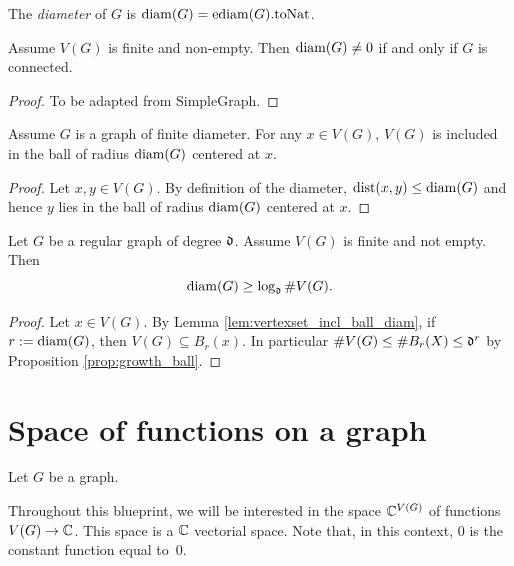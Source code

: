 \begin{definition}
  \label{def:diameter}
  The \emph{diameter} of $G$ is $\mathrm{diam}(G) = \mathrm{ediam}(G).\mathrm{toNat}$.
\end{definition}

\begin{lemma}
  \label{lem:connected_iff_diam_ne_zero}
  Assume $V(G)$ is finite and non-empty. Then $\mathrm{diam}(G) \neq 0$ if and only if
  $G$ is connected.
\end{lemma}
\begin{proof}
  To be adapted from SimpleGraph.
\end{proof}

\begin{lemma}
  \label{lem:vertexset_incl_ball_diam}
  Assume $G$ is a graph of finite diameter.
  For any $x \in V(G)$, $V(G)$ is included in the ball of radius $\mathrm{diam}(G)$
  centered at $x$.
\end{lemma}

\begin{proof}
  Let $x, y \in V(G)$. By definition of the diameter, $\mathrm{dist}(x,y) \leq \mathrm{diam}(G)$
  and hence $y$ lies in the ball of radius $\mathrm{diam}(G)$ centered at $x$.
\end{proof}

\begin{proposition}
  \label{prop:bound_diameter_regular}
  Let $G$ be a regular graph of degree $\mathfrak{d}$. Assume $V(G)$ is finite and not empty.
  Then
  \begin{equation}
    \mathrm{diam}(G) \geq \log_{\mathfrak{d}} \# V(G).
  \end{equation}
\end{proposition}

\begin{proof}
  Let $x \in V(G)$.
  By Lemma \ref{lem:vertexset_incl_ball_diam}, if $r := \mathrm{diam}(G)$,
  then $V(G) \subseteq B_r(x)$. In particular $\# V(G) \leq \# B_r(X) \leq \mathfrak{d}^r$
  by Proposition \ref{prop:growth_ball}.
\end{proof}

\section{Space of functions on a graph}

Let $G$ be a graph.

Throughout this blueprint, we will be interested in the space $\mathbb{C}^{V(G)}$
of functions $V(G) \rightarrow \mathbb{C}$. This space is a $\mathbb{C}$ vectorial space. Note that, in this
context, $0$ is the constant function equal to~$0$.

